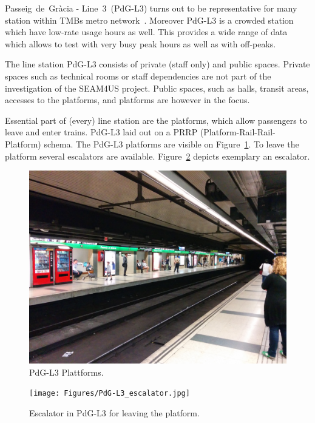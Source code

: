 Passeig~de~Gr\`{a}cia - Line~3~(PdG-L3) turns out to be representative for many station within TMBs metro network~\cite{TMB}. Moreover PdG-L3 is a crowded station which have low-rate usage hours as well. This provides a wide range of data which allows to test with very busy peak hours as well as with off-peaks.

The line station PdG-L3 consists of private (staff only) and public spaces. Private spaces such as technical rooms or staff dependencies are not part of the investigation of the SEAM4US project. Public spaces, such as halls, transit areas, accesses to the platforms, and platforms are however in the focus.

Essential part of (every) line station are the platforms, which allow passengers to leave and enter trains. PdG-L3 laid out on a PRRP (Platform-Rail-Rail-Platform) schema. The PdG-L3 platforms are visible on Figure~\ref{fig:PdG-L3_platforms}. To leave the platform several escalators are available. Figure~\ref{fig:PdG-L3_escalator} depicts exemplary an escalator.

\begin{figure}[htbp]
  \centering
  \includegraphics[width=\linewidth]{Figures/PdG-L3_platform.jpg} 
  \caption{PdG-L3 Plattforms. \cite{TMB_2014}}
  \label{fig:PdG-L3_platforms}
\end{figure}

\begin{figure}[htbp]
  \centering
  \texttt{[image: Figures/PdG-L3\_escalator.jpg]} 
  \caption{Escalator in PdG-L3 for leaving the platform. \cite{TMB_2014}}
  \label{fig:PdG-L3_escalator}
\end{figure}

